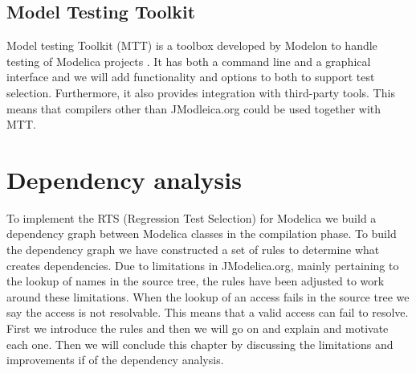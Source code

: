 \documentclass{cslthse-msc}
\begin{document}

\section{Model Testing Toolkit}
Model testing Toolkit (MTT) is a toolbox developed by Modelon to handle testing of Modelica projects \cite{modelon.comMTT}. It has both a command line and a graphical interface and we will add functionality and options to both to support test selection. Furthermore, it also provides integration with third-party tools. This means that compilers other than JModleica.org could be used together with MTT.


\chapter[Dependency analysis]{Dependency analysis}
To implement the RTS (Regression Test Selection) for Modelica we build a dependency graph between Modelica classes in the compilation phase. To build the dependency graph we have constructed a set of rules to determine what creates dependencies. Due to limitations in JModelica.org, mainly pertaining to the lookup of names in the source tree, the rules have been adjusted to work around these limitations. When the lookup of an access fails in the source tree we say the access is not resolvable. This means that a valid access can fail to resolve. First we introduce the rules and then we will go on and explain and motivate each one. Then we will conclude this chapter by discussing the limitations and improvements if of the dependency analysis.
\end{document}

